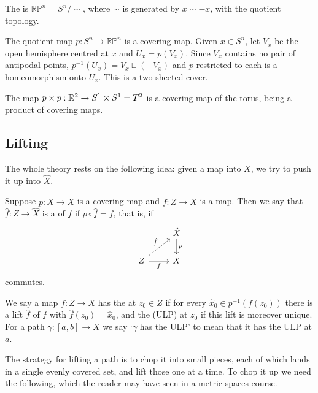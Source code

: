\documentclass[a4paper]{scrartcl}
\newcommand{\RP}{\mathbb{RP}}
\begin{document}
\begin{definition}
	The  is $\RP^n = S^n/\!\sim$, where $\sim$ is generated by $x \sim -x$, with the quotient topology.
\end{definition}

\begin{example} \label{ex:rpn-cover}
	The quotient map $p: S^n \to \RP^n$ is a covering map. Given $x \in S^n$, let $V_x$ be the open hemisphere centred at $x$ and $U_x = p(V_x)$. Since $V_x$ contains no pair of antipodal points, $p^{-1}(U_x) = V_x \sqcup (-V_x)$ and $p$ restricted to each is a homeomorphism onto $U_x$. This is a two-sheeted cover.
\end{example}

\begin{example} \label{ex:torus-cover}
	The map $p \times p: \mathbb{R}^2 \to S^1 \times S^1 = T^2$ is a covering map of the torus, being a product of covering maps.
\end{example}

\subsection{Lifting}

The whole theory rests on the following idea: given a map into $X$, we try to push it up
into $\hat X$.

\begin{definition}[Lift]
	Suppose $p: \hat{X} \rightarrow X$ is a covering map and $f: Z \rightarrow X$ is a map. Then we say that $\hat{f}: Z \rightarrow \hat{X}$ is a  of $f$ if $p \circ \hat{f}=f$, that is, if
	\[\begin{tikzcd}
		& {\hat X} \arrow[d, "p"] \\
		Z \arrow[ru, "{\hat f}", dashed] \arrow[r, "f"'] & X
	\end{tikzcd}\]
	commutes.
\end{definition}

\begin{notation}
	We say a map $f: Z \to X$ has the  at $z_0 \in Z$ if for every $\hat{x}_0 \in p^{-1}(f(z_0))$ there is a lift $\hat f$ of $f$ with $\hat{f}(z_0) = \hat{x}_0$, and the  (ULP) at $z_0$ if this lift is moreover unique. For a path $\gamma: [a,b] \to X$ we say `$\gamma$ has the ULP' to mean that it has the ULP at $a$.
\end{notation}

The strategy for lifting a path is to chop it into small pieces, each of which lands in a
single evenly covered set, and lift those one at a time. To chop it up we need the
following, which the reader may have seen in a metric spaces course.
\end{document}
